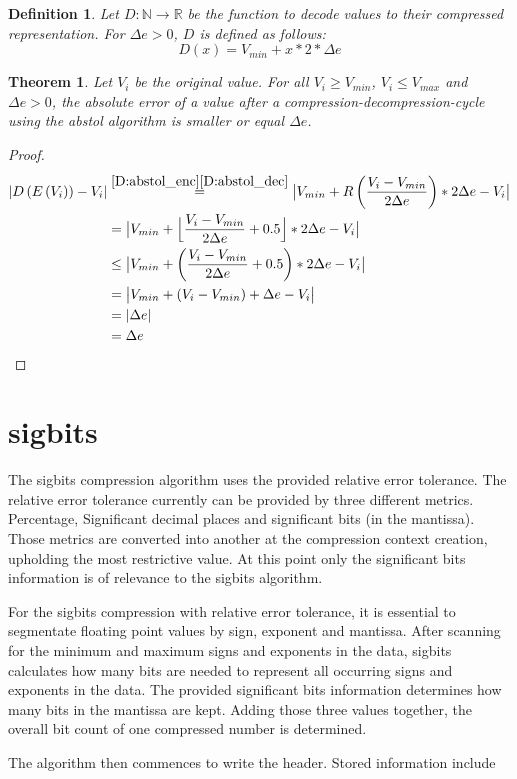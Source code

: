 \documentclass[
	12pt,
	a4paper,
	BCOR10mm,
	DIV14,
	headsepline,
]{scrreprt}
\newtheorem{theorem}{Theorem}
\newtheorem{definition}{Definition}
\DeclarePairedDelimiter{\floor}{\lfloor}{\rfloor}
\DeclarePairedDelimiter{\abs}{\lvert}{\rvert}
\begin{document}
\bigskip

\begin{definition} \label{D:abstol_dec}
	Let $D:\mathbb{N}\rightarrow\mathbb{R}$ be the function to decode values to
	their compressed representation. For $\Delta{e}>0$, $D$ is defined as
	follows:
	\[
		D\left(x\right) = V_{min} + x * 2 * \Delta{e}
	\]
\end{definition}

\clearpage

\begin{theorem} \label{T:abstol}
	Let $V_i$ be the original value. For all $V_i \ge V_{min}$,
	$V_i \le V_{max}$ and $\Delta{e} > 0$, the absolute error of a value after
	a compression-decompression-cycle using the abstol algorithm is smaller or
	equal $\Delta{e}$.
\end{theorem}

\begin{proof}
	\begingroup
	\addtolength{\jot}{1em}
	\begin{align*}
	  \lvert D\left(E\left(V_i\right)\right) - V_i\rvert
	  &\stackrel{\ref{D:abstol_enc}\ref{D:abstol_dec}}{=}\abs[\big]{V_{min} + R\left(\frac{V_i - V_{min}}{2\Delta{e}}\right) * 2\Delta{e} - V_i} \\
	  &=\abs[\big]{V_{min} + \floor[\Big]{\frac{V_i - V_{min}}{2\Delta{e}} + 0.5} * 2\Delta{e} - V_i} \\
	  &\le\abs[\big]{V_{min} + \left(\frac{V_i - V_{min}}{2\Delta{e}} + 0.5\right) * 2\Delta{e} - V_i} \\
	  &=\abs[\big]{V_{min} + \left(V_i - V_{min}\right) + \Delta{e} - V_i} \\
	  &=\abs{\Delta{e}} \\
	  &=\Delta{e} \qedhere
	\end{align*}
	\endgroup
\end{proof}

\chapter{sigbits}
\label{sigbits}

\bigskip

The sigbits compression algorithm uses the provided relative error tolerance.
The relative error tolerance currently can be provided by three different
metrics. Percentage, Significant decimal places and significant bits (in the
mantissa). Those metrics are converted into another at the compression context
creation, upholding the most restrictive value. At this point only the
significant bits information is of relevance to the sigbits algorithm. \par
For the sigbits compression with relative error tolerance, it is essential to
segmentate floating point values by sign, exponent and mantissa. After scanning
for the minimum and maximum signs and exponents in the data, sigbits calculates
how many bits are needed to represent all occurring signs and exponents in the
data. The provided significant bits information determines how many bits in the
mantissa are kept. Adding those three values together, the overall bit count of
one compressed number is determined.\par
The algorithm then commences to write the header. Stored information include
\end{document}
